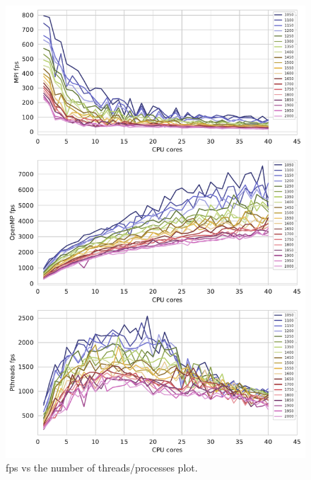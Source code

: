\documentclass[twoside,12pt]{article}
\theoremstyle{definition}
\theoremstyle{remark}
\begin{document}
\begin{figure}[h!]
    \centering
    \includegraphics[height=0.95\textheight]{../analysis/fps-core-cpu.pdf}
    \caption{fps vs the number of threads/processes plot.}
    \label{fig:fps-core-cpu}
\end{figure}
\end{document}
